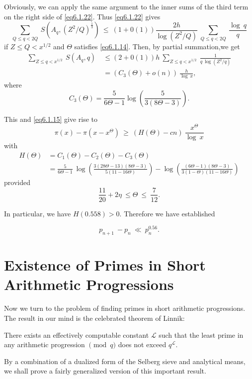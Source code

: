 Obviously, we can apply the same argument to the inner sums of the
third term on the right side of \eqref{eq6.1.22}. Thus \eqref{eq6.1.22} gives 
$$
\sum_{Q\le q < 2Q} ~ S(A_q,(Z^2/Q)^{\frac{1}{3}}) ~ \le ~
(1+0(1))\frac{2h}{\log(Z^2/Q)} ~ \sum_{Q\le q < 2Q} ~\frac{\log ~q}{q} 
$$
if $Z \le Q < x^{1/2}$ and $\Theta$ satisfies \eqref{eq6.1.14}. Then,
by partial summation,\pageoriginale we get
\begin{align*}
  \sum_{Z\le q < x^{1/2} } ~ S(A_q,q)~ & \le (2+0(1))h ~ \sum_{Z\le q
    < x^{1/2}} ~ \frac{1}{q~\log(Z^2/q)}\\ 
  & = (C_3(\Theta) + o(n)) ~ \frac{h}{\log ~x},
\end{align*}
where
$$
C_3(\Theta) = \frac{5}{6\Theta-1}  \log
\left(\frac{5}{3(8\Theta-3)}\right). 
$$

This and \eqref{eq6.1.15} give rise to 
$$
\pi(x) -\pi(x - x^{\Theta})~ \geq ~ (H(\Theta) -cn) ~ \frac{x^{\Theta}}{\log ~ x}
$$
with 
{\fontsize{10pt}{12pt}\selectfont
\begin{align*}
  H(\Theta) & = C_1(\Theta) - C_2(\Theta) - C_3(\Theta)\\
  & = \frac{5}{6\Theta-1}~\log
  \left(\frac{3(28\Theta-13)(8\Theta-3)}{5(11-16\Theta)}\right) 
  -\log\left(\frac{(6\Theta-1)(8\Theta-3)}{3(1-\Theta)(11-16\Theta)}\right) 
\end{align*}}\relax
provided
$$
\frac{11}{20} + 2\eta ~\le \Theta~\le ~\frac{7}{12}.
$$

In particular, we have $H(0.558) > 0$. Therefore we have established

\begin{theorem}\label{chap6-thm16}%
$$
p_{n+1} ~ -p_n ~ \ll ~ p^{0.56}_n. 
$$
\end{theorem}

\section{Existence of Primes in Short Arithmetic
  Progressions}\label{chap6-sec6.2} 

Now we turn to the problem of finding primes in short arithmetic\pageoriginale
progressions. The result in our mind is the celebrated theorem of
Linnik: 

There exists an effectively computable constant $\mathscr{L}$ such
that the least prime in any arithmetic progression $\pmod{q}$
does not exceed $q^{\mathscr{L}}$. 

By a combination of a dualized form of the Selberg sieve and
analytical means, we shall prove a fairly generalized version of this
important result. 

